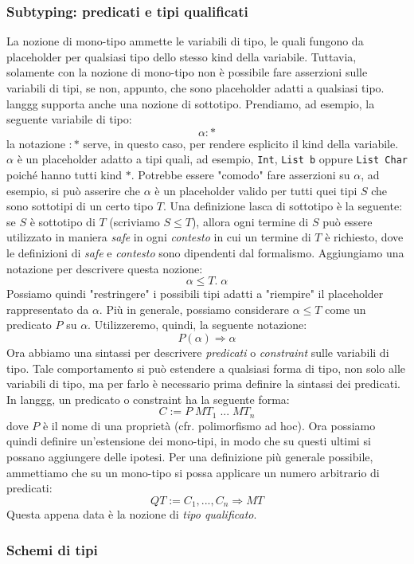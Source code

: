 \documentclass[10pt,a4paper]{article}
\begin{document}
\subsubsection{Subtyping: predicati e tipi qualificati}
La nozione di mono-tipo ammette le variabili di tipo, le quali fungono da placeholder per qualsiasi tipo dello stesso
kind della variabile. Tuttavia, solamente con la nozione di mono-tipo non è possibile fare asserzioni sulle variabili
di tipi, se non, appunto, che sono placeholder adatti a qualsiasi tipo. langgg supporta anche una nozione di sottotipo.
Prendiamo, ad esempio, la seguente variabile di tipo:
\[ \alpha : * \]
la notazione $ : * $ serve, in questo caso, per rendere esplicito il kind della variabile. $ \alpha $ è un placeholder
adatto a tipi quali, ad esempio, \texttt{Int}, \texttt{List b} oppure \texttt{List Char} poiché hanno tutti kind $ * $.
Potrebbe essere "comodo" fare asserzioni su $ \alpha $, ad esempio, si può asserire che $ \alpha $ è un placeholder
valido per tutti quei tipi $ S $ che sono sottotipi di un certo tipo $ T $. Una definizione lasca di sottotipo è la
seguente: se $ S $ è sottotipo di $ T $ (scriviamo $ S \leq T $), allora ogni termine di $ S $ può essere utilizzato
in maniera \textit{safe} in ogni \textit{contesto} in cui un termine di $ T $ è richiesto, dove le definizioni di
\textit{safe} e \textit{contesto} sono dipendenti dal formalismo.
Aggiungiamo una notazione per descrivere questa nozione:
\[ \alpha \leq T . \; \alpha \]
Possiamo quindi "restringere" i possibili tipi adatti a "riempire" il placeholder rappresentato da $ \alpha $. Più in
generale, possiamo considerare $ \alpha \leq T $ come un predicato $ P $ su $ \alpha $. Utilizzeremo, quindi, la seguente
notazione:
\[ P(\alpha) \Rightarrow \alpha \]
Ora abbiamo una sintassi per descrivere \textit{predicati} o \textit{constraint} sulle variabili di tipo. Tale
comportamento si può estendere a qualsiasi forma di tipo, non solo alle variabili di tipo, ma per farlo è necessario
prima definire la sintassi dei predicati. In langgg, un predicato o constraint ha la seguente forma:
\[ C := P \; MT_1 \; ... \; MT_n \]
dove $ P $ è il nome di una proprietà (cfr. polimorfismo ad hoc). Ora possiamo quindi definire un'estensione dei
mono-tipi, in modo che su questi ultimi si possano aggiungere delle ipotesi. Per una definizione più generale possibile,
ammettiamo che su un mono-tipo si possa applicare un numero arbitrario di predicati:
\[ QT := C_1, ..., C_n \Rightarrow MT \]
Questa appena data è la nozione di \textit{tipo qualificato}.
\subsubsection{Schemi di tipi}
\end{document}
